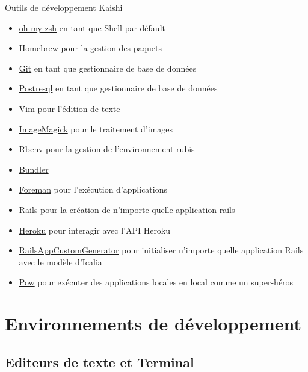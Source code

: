 \documentclass[]{report}
\begin{document}
    \begin{tcolorbox}{Outils de développement Kaishi}\label{box:kaishi_tools}
      \begin{itemize}
        \item \href{https://github.com/robbyrussell/oh-my-zsh}{oh-my-zsh}  en tant que Shell par défault
        \item \href{http://brew.sh/}{Homebrew} pour la gestion des paquets
        \item \href{http://git-scm.com/}{Git} en tant que gestionnaire de base de données
        \item \href{http://www.postgresql.org/}{Postresql} en tant que gestionnaire de base de données
        \item \href{http://www.vim.org/}{Vim} pour l'édition de texte
        \item \href{http://www.imagemagick.org/}{ImageMagick} pour le traitement d'images
        \item \href{https://github.com/sstephenson/rbenv}{Rbenv} pour la gestion de l'environnement rubis
        \item \href{http://bundler.io/}{Bundler}
        \item \href{https://github.com/ddollar/foreman}{Foreman} pour l'exécution d'applications
        \item \href{http://rubyonrails.org/}{Rails} pour la création de n'importe quelle application rails
        \item \href{https://toolbelt.heroku.com/}{Heroku} pour interagir avec l'API Heroku
        \item \href{https://github.com/IcaliaLabs/railsAppCustomGenerator}{RailsAppCustomGenerator} pour initialiser n'importe quelle application Rails avec le modèle d'Icalia
        \item \href{http://pow.cx/}{Pow} pour exécuter des applications locales en local comme un super-héros
      \end{itemize}
    \end{tcolorbox}

  \section{Environnements de développement}

    \subsection{Editeurs de texte et Terminal}
\end{document}
